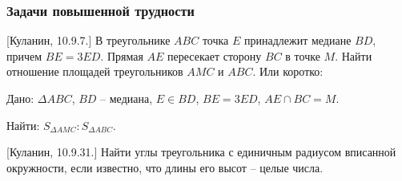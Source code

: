 \documentclass[geometry,a5paper]{pum}
\begin{document}
\begin{exercises}
\subsubsection*{Задачи повышенной трудности}
  \begin{question}
    \textcolor{darkcolortheme}{[Куланин, 10.9.7.]}
    В треугольнике $ABC$ точка $E$ принадлежит медиане $BD$, причем $BE=3ED$. Прямая $AE$ пересекает сторону $BC$ в точке $M$. Найти отношение площадей треугольников $AMC$ и $ABC$. Или коротко:

    Дано: $\Delta ABC$, $BD$ -- медиана, $E\in BD$, $BE=3ED$, $AE \cap BC=M$.
    
    Найти: $S_{\Delta AMC}:S_{\Delta ABC}$.
  \end{question}
  \begin{question}
    \textcolor{darkcolortheme}{[Куланин, 10.9.31.]}
    Найти углы треугольника с единичным радиусом вписанной окружности, если известно, что длины его высот -- целые числа.
  \end{question}
\end{exercises}
\end{document}
